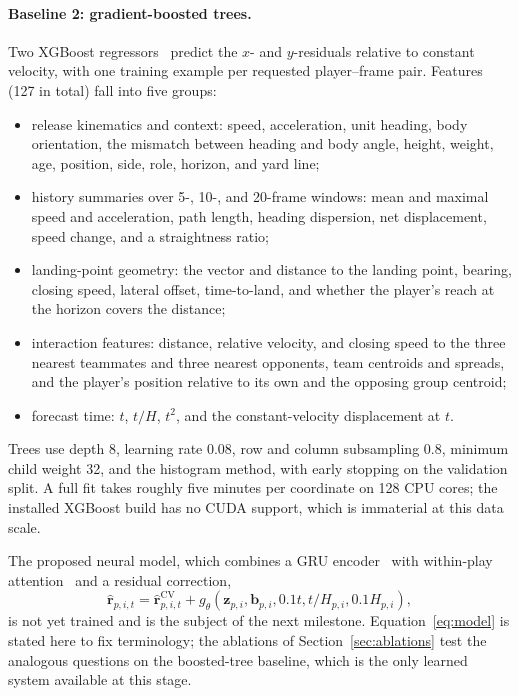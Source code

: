 \documentclass{article}
\begin{document}
\paragraph{Baseline 2: gradient-boosted trees.}
Two XGBoost regressors~\cite{xgboost} predict the $x$- and $y$-residuals relative to
constant velocity, with one training example per requested player--frame pair.
Features (127 in total) fall into five groups:
\begin{itemize}
\item release kinematics and context: speed, acceleration, unit heading, body
  orientation, the mismatch between heading and body angle, height, weight, age,
  position, side, role, horizon, and yard line;
\item history summaries over 5-, 10-, and 20-frame windows: mean and maximal speed
  and acceleration, path length, heading dispersion, net displacement, speed change,
  and a straightness ratio;
\item landing-point geometry: the vector and distance to the landing point, bearing,
  closing speed, lateral offset, time-to-land, and whether the player's reach at the
  horizon covers the distance;
\item interaction features: distance, relative velocity, and closing speed to the
  three nearest teammates and three nearest opponents, team centroids and spreads,
  and the player's position relative to its own and the opposing group centroid;
\item forecast time: $t$, $t/H$, $t^{2}$, and the constant-velocity displacement at
  $t$.
\end{itemize}
Trees use depth 8, learning rate 0.08, row and column subsampling 0.8, minimum child
weight 32, and the histogram method, with early stopping on the validation split. A
full fit takes roughly five minutes per coordinate on 128 CPU cores; the installed
XGBoost build has no CUDA support, which is immaterial at this data scale.

The proposed neural model, which combines a GRU encoder~\cite{gru} with
within-play attention~\cite{attention}
and a residual correction,
\begin{equation}
 \widehat{\mathbf{r}}_{p,i,t}
 =\widehat{\mathbf{r}}^{\mathrm{CV}}_{p,i,t}
 +g_{\theta}\!\left(\mathbf{z}_{p,i},\mathbf{b}_{p,i},0.1t,t/H_{p,i},0.1H_{p,i}\right),
 \label{eq:model}
\end{equation}
is not yet trained and is the subject of the next milestone. Equation~\eqref{eq:model}
is stated here to fix terminology; the ablations of Section~\ref{sec:ablations} test
the analogous questions on the boosted-tree baseline, which is the only learned system
available at this stage.
\end{document}
